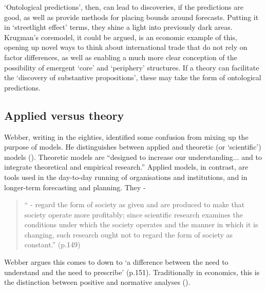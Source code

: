 `Ontological predictions', then, can lead to discoveries, if the predictions are good, as well as provide methods for placing bounds around forecasts. Putting it in `streetlight effect' terms, they shine a light into previously dark areas. Krugman's \gls{coremodel}, it could be argued, is an economic example of this, opening up novel ways to think about international trade that do not rely on factor differences, as well as enabling a much more clear conception of the possibility of emergent `core' and `periphery' structures. If a theory can facilitate the `discovery of substantive propositions', these may take the form of ontological predictions.

\subsection{Applied versus theory \label{sec:appliedvstheory}}


Webber, writing in the eighties, identified some confusion from mixing up the purpose of models. He distinguishes between applied and theoretic (or `scientific') models (\citealt{webber_explanation_1984}). Theoretic models are ``designed to increase our understanding... and to integrate theoretical and empirical research.'' Applied models, in contrast, are tools used in the day-to-day running of organisations and institutions, and in longer-term forecasting and planning. They  - 

\begin{quote}
`` - regard the form of society as given and are produced to make that society operate more profitably; since scientific research examines the conditions under which the society operates and the manner in which it is changing, such research ought not to regard the form of society as constant.'' (p.149)
\end{quote}

Webber argues this comes to down to `a difference between the need to understand and the need to prescribe' (p.151). Traditionally in economics, this is the distinction between positive and normative analyses (\citealt{friedman_essays_1953}). 

